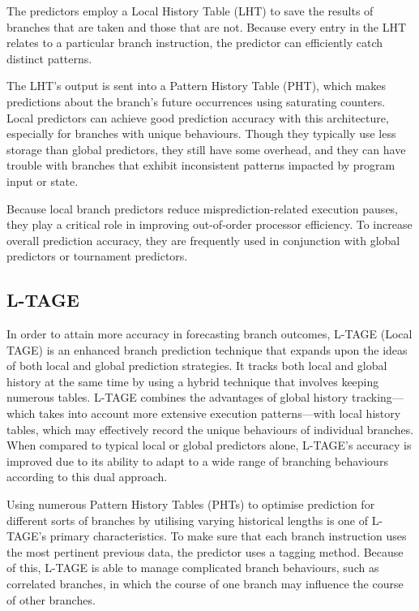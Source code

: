 \documentclass[10pt,journal,compsoc]{IEEEtran}
\begin{document}
The predictors employ a Local History Table (LHT) to save the results of branches that are taken and those that are not. 
Because every entry in the LHT relates to a particular branch instruction, the predictor can efficiently catch distinct patterns. 

The LHT's output is sent into a Pattern History Table (PHT), which makes predictions about the branch's future occurrences using saturating counters. Local predictors can achieve good prediction accuracy with this architecture, especially for branches with unique behaviours.
Though they typically use less storage than global predictors, they still have some overhead, and they can have trouble with branches that exhibit inconsistent patterns impacted by program input or state. 

Because local branch predictors reduce misprediction-related execution pauses, they play a critical role in improving out-of-order processor efficiency. To increase overall prediction accuracy, they are frequently used in conjunction with global predictors or tournament predictors.\cite{mittalSurveyTechniquesDynamic2018}
\subsection{L-TAGE}
\noindent In order to attain more accuracy in forecasting branch outcomes, L-TAGE (Local TAGE) is an enhanced branch prediction technique that expands upon the ideas of both local and global prediction strategies. It tracks both local and global history at the same time by using a hybrid technique that involves keeping numerous tables. L-TAGE combines the advantages of global history tracking—which takes into account more extensive execution patterns—with local history tables, which may effectively record the unique behaviours of individual branches. When compared to typical local or global predictors alone, L-TAGE's accuracy is improved due to its ability to adapt to a wide range of branching behaviours according to this dual approach.

Using numerous Pattern History Tables (PHTs) to optimise prediction for different sorts of branches by utilising varying historical lengths is one of L-TAGE's primary characteristics. To make sure that each branch instruction uses the most pertinent previous data, the predictor uses a tagging method. Because of this, L-TAGE is able to manage complicated branch behaviours, such as correlated branches, in which the course of one branch may influence the course of other branches.
\end{document}
